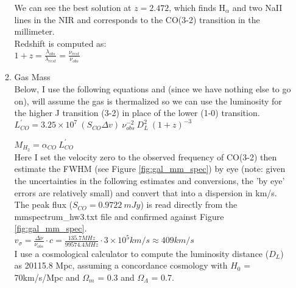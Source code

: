 \documentclass[11pt]{article}
\begin{document}
\begin{enumerate}
\begin{enumerate}
	We can see the best solution at $z = 2.472$, which finds H$_{\alpha}$ and two NaII lines in the NIR and corresponds to the CO(3-2) transition in the millimeter.\\
	
	Redshift is computed as:\\
	
	\hspace{10mm} $1 + z = \frac{\displaystyle\lambda_{obs}}{\displaystyle \lambda_{rest}} = \frac{\displaystyle\nu_{rest}}{\displaystyle \nu_{obs}}$\\
	
	
	
	\item Gas Mass%
	\\
	
	Below, I use the following equations and (since we have nothing else to go on), will assume the gas is thermalized so we can use the luminosity for the higher J transition (3-2) in place of the lower (1-0) transition.\\
	
	\hspace{10mm} $L^{'}_{CO} = 3.25 \times 10^{7}\ (S_{CO} \Delta v)\ \nu_{obs}^{-2}\ D_L^2\ (1+z)^{-3}$
	
	\hspace{10mm} $M_{H_2} = \alpha_{CO}\ L^{'}_{CO}$\\
	
	Here I set the velocity zero to the observed frequency of CO(3-2) then estimate the FWHM (see Figure \ref{fig:gal_mm_spec}) by eye (note: given the uncertainties in the following estimates and conversions, the 'by eye' errors are relatively small) and convert that into a dispersion in km/s. The peak flux ($S_{CO} = 0.9722\ mJy$) is read directly from the mmspectrum\_hw3.txt file and confirmed against Figure \ref{fig:gal_mm_spec}.\\
	
	\hspace{10mm} $v_{\sigma} = \frac{\displaystyle \Delta \nu}{\displaystyle \nu_{obs}} \cdot c = \frac{\displaystyle 135.7MHz}{\displaystyle 99574.4MHz} \cdot 3 \times 10^{5}km/s \approx 409 km/s$\\
	
	I use a cosmological calculator to compute the luminosity distance ($D_L$) as 20115.8 Mpc, assuming a concordance cosmology with $H_0$ = 70km/s/Mpc and $\Omega_m$ = 0.3 and $\Omega_{\Lambda}$ = 0.7.\\
	

\end{enumerate}
\end{enumerate}
\end{document}
